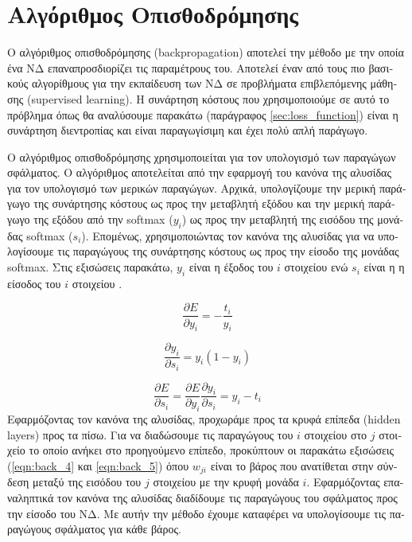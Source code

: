 \pagebreak
\section{\textgreek{Αλγόριθμος Οπισθοδρόμησης}}
\textgreek{Ο αλγόριθμος οπισθοδρόμησης }(backpropagation) \cite{bptt_1} \textgreek{αποτελεί την μέθοδο με την οποία ένα ΝΔ επαναπροσδιορίζει τις παραμέτρους του. Αποτελεί έναν από τους πιο βασικούς αλγορίθμους για την εκπαίδευση των ΝΔ σε προβλήματα επιβλεπόμενης μάθησης }(supervised learning). \textgreek{Η συνάρτηση κόστους που χρησιμοποιούμε σε αυτό το πρόβλημα όπως θα αναλύσουμε παρακάτω (παράγραφος }\ref{sec:loss_function})\textgreek{ είναι η συνάρτηση διεντροπίας και είναι παραγωγίσιμη και έχει πολύ απλή παράγωγο.}
\par
\textgreek{Ο αλγόριθμος οπισθοδρόμησης χρησιμοποιείται για τον υπολογισμό των παραγώγων σφάλματος. Ο αλγόριθμος αποτελείται από την εφαρμογή του κανόνα της αλυσίδας για τον υπολογισμό των μερικών παραγώγων. Αρχικά, υπολογίζουμε την μερική παράγωγο της συνάρτησης κόστους ως προς την μεταβλητή εξόδου και την μερική παράγωγο της εξόδου από την } softmax ($y_i$) \textgreek{ως προς την μεταβλητή της εισόδου της μονάδας }softmax ($s_i$). \textgreek{Επομένως, χρησιμοποιώντας τον κανόνα της αλυσίδας για να υπολογίσουμε τις παραγώγους της συνάρτησης κόστους ως προς την είσοδο της μονάδας }softmax. \textgreek{Στις εξισώσεις παρακάτω, $y_i$ είναι η έξοδος του $i$ στοιχείου ενώ $s_i$ είναι η η είσοδος του $i$ στοιχείου }\cite{backprop_notes}.  

\begin{equation}
 \frac{\partial E}{\partial y_i} = -\frac{t_i}{y_i}
\end{equation}

\begin{equation}
 \frac{\partial y_i}{\partial s_i} = y_i(1-y_i)
\end{equation}

\begin{equation}
 \frac{\partial E}{\partial s_i} =\frac{\partial E}{\partial y_i} \frac{\partial y_i}{\partial s_i} = y_i-t_i
\end{equation}
\textgreek{Εφαρμόζοντας τον κανόνα της αλυσίδας, προχωράμε προς τα κρυφά επίπεδα }(hidden layers) \textgreek{προς τα πίσω. Για να διαδώσουμε τις παραγώγους του $i$ στοιχείου στο $j$ στοιχείο το οποίο ανήκει στο προηγούμενο επίπεδο, προκύπτουν οι παρακάτω εξισώσεις} (\ref{eqn:back_4} \textgreek{και} \ref{eqn:back_5}) \textgreek{όπου $w_{ji}$ είναι το βάρος που ανατίθεται στην σύνδεση μεταξύ της εισόδου του $j$ στοιχείου με την κρυφή μονάδα $i$. Εφαρμόζοντας επαναληπτικά τον κανόνα της αλυσίδας διαδίδουμε τις παραγώγους του σφάλματος προς την είσοδο του ΝΔ. Με αυτήν την μέθοδο έχουμε καταφέρει να υπολογίσουμε τις παραγώγους σφάλματος για κάθε βάρος.}


